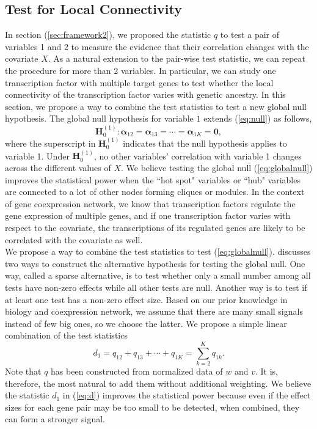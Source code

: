 \documentclass[aap,authoryear, preprint]{imsart}
\numberwithin{equation}{section}
\theoremstyle{plain}
\begin{document}
\subsection{Test for Local Connectivity \label{sec:frameworkK}} 
In section (\ref{sec:framework2}), we proposed the statistic $q$ to test a pair of variables 1 and 2 to measure the evidence that their correlation changes with the covariate $X$. As a natural extension to the pair-wise test statistic, we can repeat the procedure for more than 2 variables. In particular, we can study one transcription factor with  multiple target genes to test whether the local connectivity of the transcription factor varies with genetic ancestry. In this section, we propose a way to combine the test statistics to test a new global null hypothesis. The global null hypothesis for variable $1$ extends (\ref{eq:null}) as follows,
\begin{equation}
    \bm{H}_0^{(1)}: \bm{\alpha}_{12} = \bm{\alpha}_{13} = \cdots = \bm{\alpha}_{1K} = \bm{0},
\label{eq:globalnull}
\end{equation}
where the superscript in $\bm{H}_0^{(1)}$ indicates that the null hypothesis applies to variable 1. Under $\bm{H}_0^{(1)}$, no other variables' correlation with variable 1 changes across the different values of  $X$. We believe testing the global null (\ref{eq:globalnull}) improves the statistical power when the ``hot spot" variables or ``hub" variables are connected to a lot of other nodes forming cliques or modules. In the context of gene coexpression network, we know that transcription factors regulate the gene expression of multiple genes, and if one transcription factor varies with respect to the covariate, the transcriptions of its regulated genes are likely to be correlated with the covariate as well. \\

We propose a way to combine the test statistics to test (\ref{eq:globalnull}). \cite{chen2012exponential} discusses two ways to construct the alternative hypothesis for testing the global null. One way, called a sparse alternative, is to test whether only a small number among all tests have non-zero effects while all other tests are null. Another way is to test if at least one test has a non-zero effect size. Based on our prior knowledge in biology and coexpression network, we assume that there are many small signals instead of few big ones, so we choose the latter. We propose a simple linear combination of the test statistics
\begin{equation}
d_1 = {q}_{12} + {q}_{13} + \cdots + {q}_{1K} = \sum_{k=2}^{K} {q}_{1k}.
\label{eq:d}
\end{equation}
Note that $q$ has been constructed from normalized data of $w$ and $v$. It is, therefore, the most natural to add them without additional weighting. We believe the statistic $d_1$ in  (\ref{eq:d}) improves the statistical power because even if the effect sizes for each gene pair may be too small to be detected, when combined, they can form a stronger signal. \\
\end{document}
